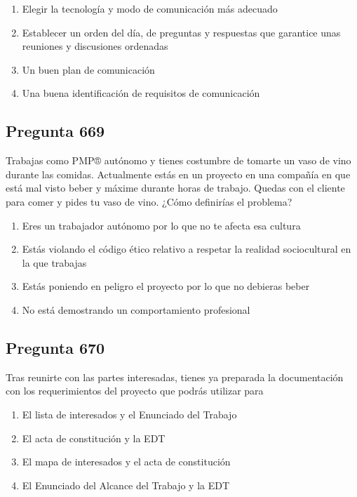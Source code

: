 \documentclass[11pt,a4paper]{article}
\begin{document}
\begin{enumerate}[label=\alph*)]
  \item Elegir la tecnología y modo de comunicación más adecuado
  \item Establecer un orden del día, de preguntas y respuestas que garantice unas reuniones y discusiones ordenadas
  \item Un buen plan de comunicación
  \item Una buena identificación de requisitos de comunicación
\end{enumerate}

\subsection*{Pregunta 669}
Trabajas como PMP® autónomo y tienes costumbre de tomarte un vaso de vino durante las comidas. Actualmente estás en un proyecto en una compañía en que está mal visto beber y máxime durante horas de trabajo. Quedas con el cliente para comer y pides tu vaso de vino. ¿Cómo definirías el problema?

\begin{enumerate}[label=\alph*)]
  \item Eres un trabajador autónomo por lo que no te afecta esa cultura
  \item Estás violando el código ético relativo a respetar la realidad sociocultural en la que trabajas
  \item Estás poniendo en peligro el proyecto por lo que no debieras beber
  \item No está demostrando un comportamiento profesional
\end{enumerate}

\subsection*{Pregunta 670}
Tras reunirte con las partes interesadas, tienes ya preparada la documentación con los requerimientos del proyecto que podrás utilizar para

\begin{enumerate}[label=\alph*)]
  \item El lista de interesados y el Enunciado del Trabajo
  \item El acta de constitución y la EDT
  \item El mapa de interesados y el acta de constitución
  \item El Enunciado del Alcance del Trabajo y la EDT
\end{enumerate}
\end{document}
